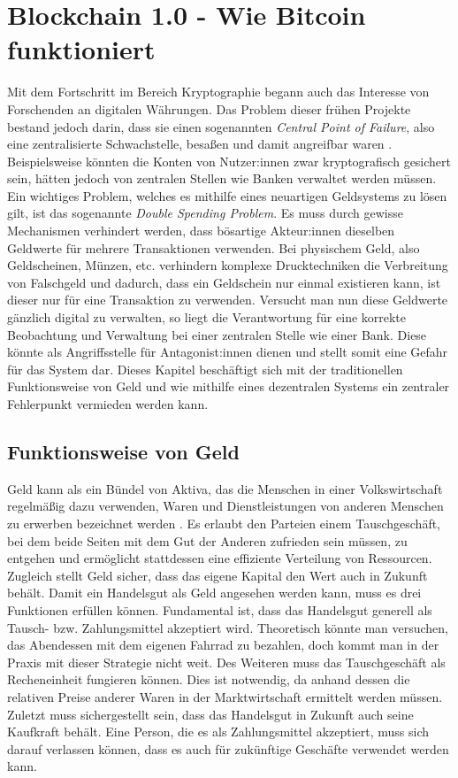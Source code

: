 \chapter{Blockchain 1.0 - Wie Bitcoin funktioniert}
Mit dem Fortschritt im Bereich Kryptographie begann auch das Interesse von Forschenden an digitalen Währungen. 
Das Problem dieser frühen Projekte bestand jedoch darin, dass sie einen sogenannten \emph{Central Point of Failure}, also eine zentralisierte Schwachstelle, besaßen und damit angreifbar waren \cite[]{antanopoulos_2014}. 
Beispielsweise könnten die Konten von Nutzer:innen zwar kryptografisch gesichert sein, hätten jedoch von zentralen Stellen wie Banken verwaltet werden müssen.
Ein wichtiges Problem, welches es mithilfe eines neuartigen Geldsystems zu lösen gilt, ist das sogenannte \emph{Double Spending Problem}. Es muss durch gewisse Mechanismen verhindert werden, dass bösartige Akteur:innen dieselben Geldwerte für mehrere Transaktionen verwenden. Bei physischem Geld, also Geldscheinen, Münzen, etc. verhindern komplexe Drucktechniken die Verbreitung von Falschgeld und dadurch, dass ein Geldschein nur einmal existieren kann, ist dieser nur für eine Transaktion zu verwenden.
Versucht man nun diese Geldwerte gänzlich digital zu verwalten, so liegt die Verantwortung für eine korrekte Beobachtung und Verwaltung bei einer zentralen Stelle wie einer Bank. Diese könnte als Angriffsstelle für Antagonist:innen dienen und stellt somit eine Gefahr für das System dar.
Dieses Kapitel beschäftigt sich mit der traditionellen Funktionsweise von Geld und wie mithilfe eines dezentralen Systems ein zentraler Fehlerpunkt vermieden werden kann. 
\section{Funktionsweise von Geld}
Geld kann als \glqq ein Bündel von Aktiva, das die Menschen in einer Volkswirtschaft regelmäßig dazu verwenden, Waren und Dienstleistungen von anderen Menschen zu erwerben\grqq{} bezeichnet werden \cite[S. 804]{mankiw_taylor_2018}.
Es erlaubt den Parteien einem Tauschgeschäft, bei dem beide Seiten mit dem Gut der Anderen zufrieden sein müssen, zu entgehen und ermöglicht stattdessen eine effiziente Verteilung von Ressourcen. Zugleich stellt Geld sicher, dass das eigene Kapital den Wert auch in Zukunft behält.
Damit ein Handelsgut als Geld angesehen werden kann, muss es drei Funktionen erfüllen können.
Fundamental ist, dass das Handelsgut generell als Tausch- bzw. Zahlungsmittel akzeptiert wird. Theoretisch könnte man versuchen, das Abendessen mit dem eigenen Fahrrad zu bezahlen, doch kommt man in der Praxis mit dieser Strategie nicht weit.
Des Weiteren muss das Tauschgeschäft als Recheneinheit fungieren können. Dies ist notwendig, da anhand dessen die relativen Preise anderer Waren in der Marktwirtschaft ermittelt werden müssen.
Zuletzt muss sichergestellt sein, dass das Handelsgut in Zukunft auch seine Kaufkraft behält. Eine Person, die es als Zahlungsmittel akzeptiert, muss sich darauf verlassen können, dass es auch für zukünftige Geschäfte verwendet werden kann.\\

